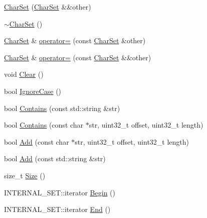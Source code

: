 \begin{DoxyCompactItemize}
\mbox{\hyperlink{classlucene_1_1core_1_1analysis_1_1characterutil_1_1CharSet_a263fdea9d1abee5f4f2af6afcf4f6771}{Char\+Set}} (\mbox{\hyperlink{classlucene_1_1core_1_1analysis_1_1characterutil_1_1CharSet}{Char\+Set}} \&\&other)
\item 
\mbox{\hyperlink{classlucene_1_1core_1_1analysis_1_1characterutil_1_1CharSet_ade8980396209cc39e08d6235afec7cb4}{$\sim$\+Char\+Set}} ()
\item 
\mbox{\hyperlink{classlucene_1_1core_1_1analysis_1_1characterutil_1_1CharSet}{Char\+Set}} \& \mbox{\hyperlink{classlucene_1_1core_1_1analysis_1_1characterutil_1_1CharSet_af733c1ca8ab800f6734222d15b696d90}{operator=}} (const \mbox{\hyperlink{classlucene_1_1core_1_1analysis_1_1characterutil_1_1CharSet}{Char\+Set}} \&other)
\item 
\mbox{\hyperlink{classlucene_1_1core_1_1analysis_1_1characterutil_1_1CharSet}{Char\+Set}} \& \mbox{\hyperlink{classlucene_1_1core_1_1analysis_1_1characterutil_1_1CharSet_a75d7014ce0e683dcce2afe2f2b0ac76f}{operator=}} (const \mbox{\hyperlink{classlucene_1_1core_1_1analysis_1_1characterutil_1_1CharSet}{Char\+Set}} \&\&other)
\item 
void \mbox{\hyperlink{classlucene_1_1core_1_1analysis_1_1characterutil_1_1CharSet_a7c1ba73acd1bd01e13050bee427ec660}{Clear}} ()
\item 
bool \mbox{\hyperlink{classlucene_1_1core_1_1analysis_1_1characterutil_1_1CharSet_ac79e72d9f869029e339c37d118a65772}{Ignore\+Case}} ()
\item 
bool \mbox{\hyperlink{classlucene_1_1core_1_1analysis_1_1characterutil_1_1CharSet_a6ffa312595246916fd97a235271bf9ce}{Contains}} (const std\+::string \&str)
\item 
bool \mbox{\hyperlink{classlucene_1_1core_1_1analysis_1_1characterutil_1_1CharSet_a4b5e988cfe249cbb1cca7d82192413bd}{Contains}} (const char $\ast$str, uint32\+\_\+t offset, uint32\+\_\+t length)
\item 
bool \mbox{\hyperlink{classlucene_1_1core_1_1analysis_1_1characterutil_1_1CharSet_a1095a6755eea6fdb8bbdcb9a1473016d}{Add}} (const char $\ast$str, uint32\+\_\+t offset, uint32\+\_\+t length)
\item 
bool \mbox{\hyperlink{classlucene_1_1core_1_1analysis_1_1characterutil_1_1CharSet_a36330b68e40f70ce13cedaaf8c9fdef3}{Add}} (const std\+::string \&str)
\item 
size\+\_\+t \mbox{\hyperlink{classlucene_1_1core_1_1analysis_1_1characterutil_1_1CharSet_a417143d7ff1ec688ff1cba9cfb65aa8c}{Size}} ()
\item 
I\+N\+T\+E\+R\+N\+A\+L\+\_\+\+S\+E\+T\+::iterator \mbox{\hyperlink{classlucene_1_1core_1_1analysis_1_1characterutil_1_1CharSet_ae20a14777198414d26154c63d2769ad7}{Begin}} ()
\item 
I\+N\+T\+E\+R\+N\+A\+L\+\_\+\+S\+E\+T\+::iterator \mbox{\hyperlink{classlucene_1_1core_1_1analysis_1_1characterutil_1_1CharSet_a644fed6aed2b68682a4d949a2a65d8d7}{End}} ()
\end{DoxyCompactItemize}
